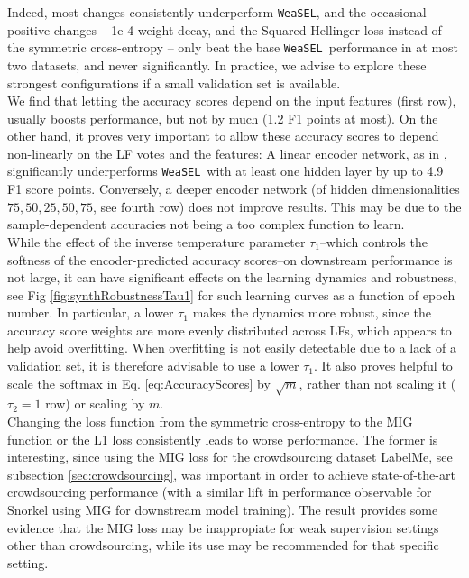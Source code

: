 \documentclass{article}
\newcommand{\softmax}{\mathrm{softmax}}
\newcommand{\weasel}{\texttt{WeaSEL}}\newcommand{\brackets}[1]{\left( #1 \right)}
\begin{document}
Indeed, most changes consistently underperform \weasel, and the occasional positive changes -- 1e-4 weight decay, and the Squared Hellinger loss instead of the symmetric cross-entropy -- only beat the base \weasel\ performance in at most two datasets, and never significantly. In practice, we advise to explore these strongest configurations if a small validation set is available.
\\
We find that letting the accuracy scores depend on the input features (first row), usually boosts performance, but not by much (1.2 F1 points at most).
On the other hand, it proves very important to allow these accuracy scores to depend non-linearly on the LF votes and the features: A linear encoder network, as in \cite{MaxMIG}, significantly underperforms \weasel\ with at least one hidden layer by up to 4.9 F1 score points.
Conversely, a deeper encoder network (of hidden dimensionalities $75,50,25,50,75$, see fourth row) does not improve results. This may be due to the sample-dependent accuracies not being a too complex function to learn.  
\\
While the effect of the inverse temperature parameter $\tau_1$--which controls the softness of the encoder-predicted accuracy scores--on downstream performance is not large, it can have significant effects on the learning dynamics and robustness, see Fig \ref{fig:synthRobustnessTau1} for such learning curves as a function of epoch number. In particular, a lower $\tau_1$ makes the dynamics more robust, since the accuracy score weights are more evenly distributed across LFs, which appears to help avoid overfitting. When overfitting is not easily detectable due to a lack of a validation set, it is therefore advisable to use a lower $\tau_1$.
It also proves helpful to scale the $\softmax$ in Eq. \ref{eq:AccuracyScores} by $\sqrt{m}$, rather than not scaling it ($\tau_2 = 1$ row) or scaling by $m$.
\\
Changing the loss function from the symmetric cross-entropy to the MIG function \cite{MaxMIG} or the L1 loss consistently leads to worse performance. The former is interesting, since using the MIG loss for the crowdsourcing dataset LabelMe, see subsection \ref{sec:crowdsourcing}, was important in order to achieve state-of-the-art crowdsourcing performance (with a similar lift in performance observable for Snorkel using MIG for downstream model training).
The result provides some evidence that the MIG loss may be inappropiate for weak supervision settings other than crowdsourcing, while its use may be recommended for that specific setting.
\end{document}
